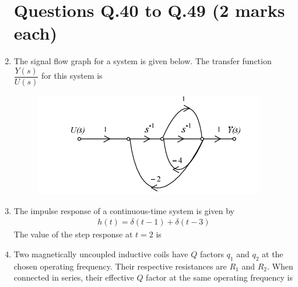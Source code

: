 \documentclass[journal,12pt,onecolumn]{IEEEtran}
\theoremstyle{remark}
\begin{document}
\begin{enumerate}
\section*{Questions Q.40 to Q.49 (2 marks each)}




\item The signal flow graph for a system is given below. The transfer function $\dfrac{Y(s)}{U(s)}$ for this system is
\begin{figure}[h]
    \centering
    \includegraphics[width=0.5\columnwidth]{figs/19.png}
    \label{fig:placeholder}
\end{figure}
\begin{enumerate}
\end{enumerate}


\item The impulse response of a continuous-time system is given by 
\begin{align*}
    h(t) = \delta(t-1)+\delta(t-3)
\end{align*}
The value of the step response at $t=2$ is

\begin{enumerate}
\end{enumerate}

\item Two magnetically uncoupled inductive coils have $Q$ factors $q_1$ and $q_2$ at the chosen operating frequency. Their respective resistances are $R_1$ and $R_2$. When connected in series, their effective $Q$ factor at the same operating frequency is


\end{enumerate}
\end{document}
